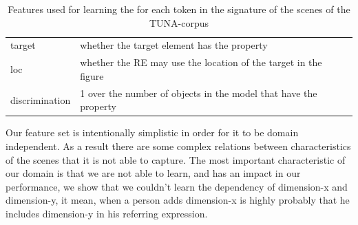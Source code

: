 \begin{small}
\begin{table}[h!]
\begin{center}
\begin{tabular}{|l|p{10cm}|}
\hline
target & whether the target element has the property \\
loc & whether the RE may use the location of the target in the figure\\
discrimination & 1 over the number of objects in the model that have the property \\
\hline
\end{tabular}
\caption{Features used for learning the \puse for each token in the signature of the scenes of the TUNA-corpus} 
\label{features}
\end{center}
\end{table}
\end{small}
Our feature set is intentionally simplistic in order for it to be domain independent. As a result there are some complex relations 
between characteristics of the scenes that it is not able to capture. The most important characteristic of our domain is that we are not able 
to learn, and has an impact in our performance, we show that we couldn't learn the dependency of dimension-x and dimension-y, it mean, when a person adds dimension-x is highly probably that he includes dimension-y in his referring expression. 
